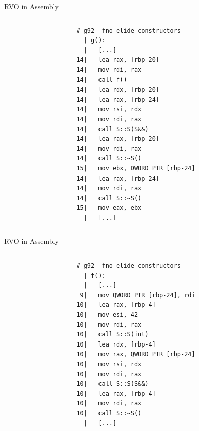 \documentclass[compress,aspectratio=1610]{beamer}
\newcommand{\inputcpplisting}[1]{}
\begin{document}
\begin{frame}[fragile]{RVO in Assembly}
    \begin{columns}[t]
        \begin{column}{.45\textwidth}
            \inputcpplisting{snippet7}
        \end{column}
        \begin{column}{.45\textwidth}
            \begin{lstlisting}[language={},morekeywords={rdi},numbers=none]
# g92 -fno-elide-constructors
  | g():
  |   [...]
14|   lea rax, [rbp-20]
14|   mov rdi, rax
14|   call f()
14|   lea rdx, [rbp-20]
14|   lea rax, [rbp-24]
14|   mov rsi, rdx
14|   mov rdi, rax
14|   call S::S(S&&)
14|   lea rax, [rbp-20]
14|   mov rdi, rax
14|   call S::~S()
15|   mov ebx, DWORD PTR [rbp-24]
14|   lea rax, [rbp-24]
14|   mov rdi, rax
14|   call S::~S()
15|   mov eax, ebx
  |   [...]      
            \end{lstlisting}
        \end{column}
    \end{columns}
\end{frame}

\begin{frame}[fragile]{RVO in Assembly}
    \begin{columns}[t]
        \begin{column}{.45\textwidth}
            \inputcpplisting{snippet7}
        \end{column}
        \begin{column}{.45\textwidth}
            \begin{lstlisting}[language={},morekeywords={rdi},numbers=none]
# g92 -fno-elide-constructors
  | f():
  |   [...]
 9|   mov QWORD PTR [rbp-24], rdi
10|   lea rax, [rbp-4]
10|   mov esi, 42
10|   mov rdi, rax
10|   call S::S(int)
10|   lea rdx, [rbp-4]
10|   mov rax, QWORD PTR [rbp-24]
10|   mov rsi, rdx
10|   mov rdi, rax
10|   call S::S(S&&)
10|   lea rax, [rbp-4]
10|   mov rdi, rax
10|   call S::~S()
  |   [...]      
            \end{lstlisting}
        \end{column}
    \end{columns}
\end{frame}
\end{document}
